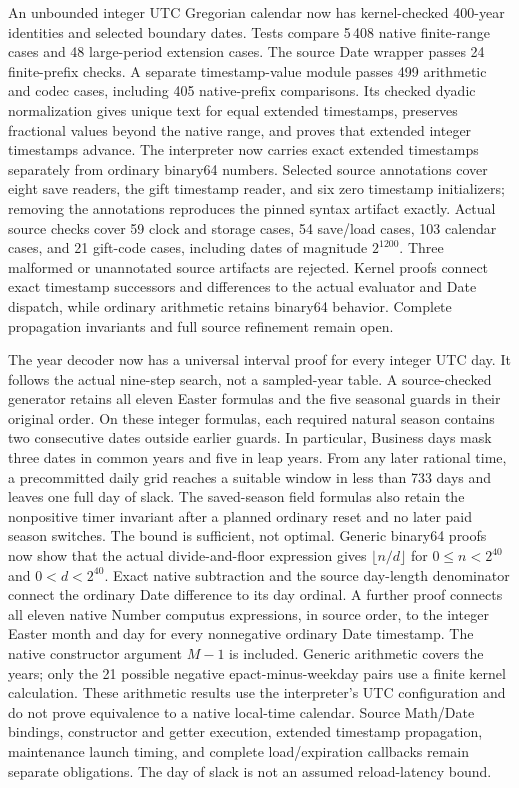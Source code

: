 \documentclass[11pt,a4paper]{article}
\numberwithin{equation}{section}
\theoremstyle{definition}
\theoremstyle{remark}
\begin{document}
An unbounded integer UTC Gregorian calendar now has kernel-checked 400-year identities and selected boundary dates. Tests compare 5\,408 native finite-range cases and 48 large-period extension cases. The source Date wrapper passes 24 finite-prefix checks. A separate timestamp-value module passes 499 arithmetic and codec cases, including 405 native-prefix comparisons. Its checked dyadic normalization gives unique text for equal extended timestamps, preserves fractional values beyond the native range, and proves that extended integer timestamps advance. The interpreter now carries exact extended timestamps separately from ordinary binary64 numbers. Selected source annotations cover eight save readers, the gift timestamp reader, and six zero timestamp initializers; removing the annotations reproduces the pinned syntax artifact exactly. Actual source checks cover 59 clock and storage cases, 54 save/load cases, 103 calendar cases, and 21 gift-code cases, including dates of magnitude $2^{1200}$. Three malformed or unannotated source artifacts are rejected. Kernel proofs connect exact timestamp successors and differences to the actual evaluator and Date dispatch, while ordinary arithmetic retains binary64 behavior. Complete propagation invariants and full source refinement remain open.

The year decoder now has a universal interval proof for every integer UTC day. It follows the actual nine-step search, not a sampled-year table. A source-checked generator retains all eleven Easter formulas and the five seasonal guards in their original order. On these integer formulas, each required natural season contains two consecutive dates outside earlier guards. In particular, Business days mask three dates in common years and five in leap years. From any later rational time, a precommitted daily grid reaches a suitable window in less than 733 days and leaves one full day of slack. The saved-season field formulas also retain the nonpositive timer invariant after a planned ordinary reset and no later paid season switches. The bound is sufficient, not optimal. Generic binary64 proofs now show that the actual divide-and-floor expression gives $\lfloor n/d\rfloor$ for $0\leq n<2^{40}$ and $0<d<2^{40}$. Exact native subtraction and the source day-length denominator connect the ordinary Date difference to its day ordinal. A further proof connects all eleven native Number computus expressions, in source order, to the integer Easter month and day for every nonnegative ordinary Date timestamp. The native constructor argument $M-1$ is included. Generic arithmetic covers the years; only the 21 possible negative epact-minus-weekday pairs use a finite kernel calculation. These arithmetic results use the interpreter's UTC configuration and do not prove equivalence to a native local-time calendar. Source Math/Date bindings, constructor and getter execution, extended timestamp propagation, maintenance launch timing, and complete load/expiration callbacks remain separate obligations. The day of slack is not an assumed reload-latency bound.
\end{document}
